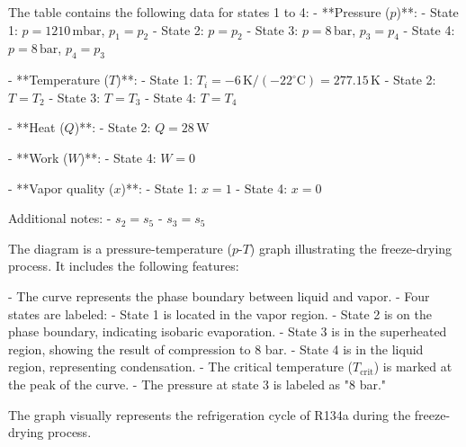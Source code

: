 The table contains the following data for states 1 to 4:  
- **Pressure (\(p\))**:  
  - State 1: \( p = 1210 \, \text{mbar} \), \( p_1 = p_2 \)  
  - State 2: \( p = p_2 \)  
  - State 3: \( p = 8 \, \text{bar} \), \( p_3 = p_4 \)  
  - State 4: \( p = 8 \, \text{bar} \), \( p_4 = p_3 \)  

- **Temperature (\(T\))**:  
  - State 1: \( T_i = -6 \, \text{K} / (-22^\circ\text{C}) = 277.15 \, \text{K} \)  
  - State 2: \( T = T_2 \)  
  - State 3: \( T = T_3 \)  
  - State 4: \( T = T_4 \)  

- **Heat (\(Q\))**:  
  - State 2: \( Q = 28 \, \text{W} \)  

- **Work (\(W\))**:  
  - State 4: \( W = 0 \)  

- **Vapor quality (\(x\))**:  
  - State 1: \( x = 1 \)  
  - State 4: \( x = 0 \)  

Additional notes:  
- \( s_2 = s_5 \)  
- \( s_3 = s_5 \)

The diagram is a pressure-temperature (\(p\)-\(T\)) graph illustrating the freeze-drying process. It includes the following features:  

- The curve represents the phase boundary between liquid and vapor.  
- Four states are labeled:  
  - State 1 is located in the vapor region.  
  - State 2 is on the phase boundary, indicating isobaric evaporation.  
  - State 3 is in the superheated region, showing the result of compression to 8 bar.  
  - State 4 is in the liquid region, representing condensation.  
- The critical temperature (\(T_{\text{crit}}\)) is marked at the peak of the curve.  
- The pressure at state 3 is labeled as "8 bar."  

The graph visually represents the refrigeration cycle of R134a during the freeze-drying process.